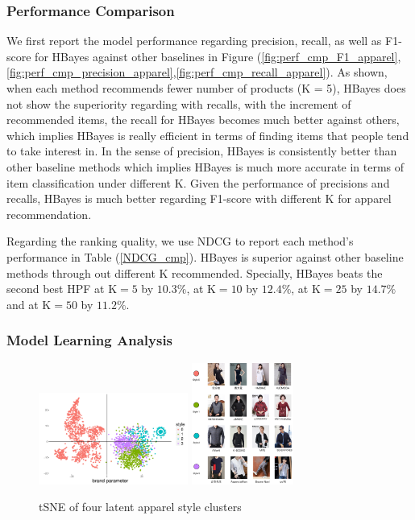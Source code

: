 {\subsubsection{Performance Comparison}
We first report the model performance regarding precision, recall, as well as F1-score for HBayes against other baselines in Figure (\ref{fig:perf_cmp_F1_apparel},\ref{fig:perf_cmp_precision_apparel},\ref{fig:perf_cmp_recall_apparel}).  As shown, when each method recommends fewer number of products (K = 5), HBayes does not show the superiority regarding with recalls, with the increment of recommended items, the recall for HBayes becomes much better against others, which implies HBayes is really efficient in terms of finding items that people tend to take interest in.  In the sense of precision, HBayes is consistently better than other baseline methods which implies HBayes is much more accurate in terms of item classification under different K.   Given the performance of precisions and recalls, HBayes is much better regarding F1-score with different K for apparel recommendation.

Regarding the ranking quality, we use NDCG to report each method's performance in Table (\ref{NDCG_cmp}).  HBayes is superior against other baseline methods through out different K recommended.  Specially, HBayes beats the second best HPF at $\text{K}=5$ by $10.3\%$, at $\text{K}=10$ by $12.4\%$, at $\text{K}=25$ by $14.7\%$ and at $\text{K}=50$ by $11.2\%$.  

\subsubsection{Model Learning Analysis}
\begin{figure}
\includegraphics[width=0.58\columnwidth,height=3cm]{fig/brand_tsne}
\includegraphics[width=0.39\columnwidth,height=4cm]{fig/style-brand}
\caption{tSNE of four latent apparel style clusters}
\label{fig:tsne-represntation-style-cluster}
\end{figure}

}
